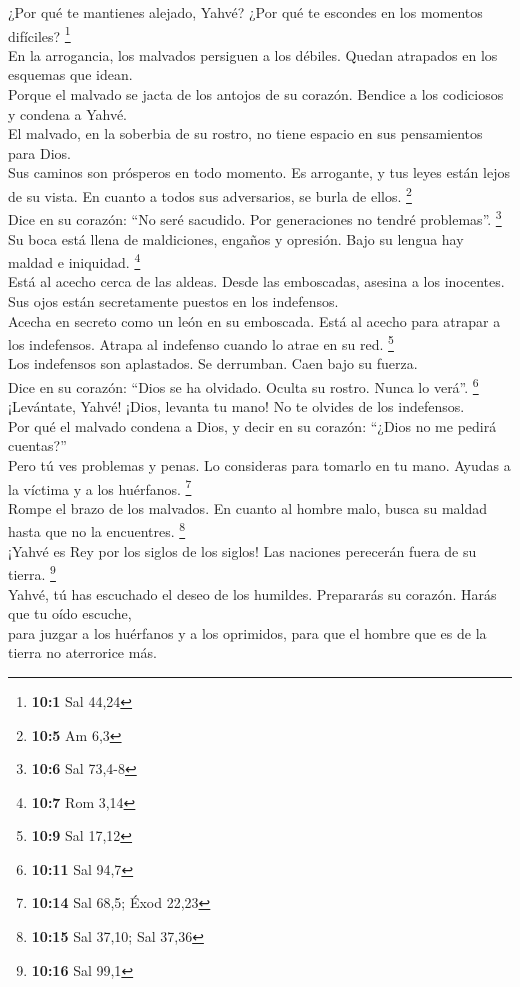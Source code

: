  ¿Por qué te mantienes alejado, Yahvé? ¿Por qué te
escondes en los momentos difíciles? \footnote{\textbf{10:1} Sal 44,24}\\
 En la arrogancia, los malvados persiguen a los débiles.
Quedan atrapados en los esquemas que idean.\\
 Porque el malvado se jacta de los antojos de su corazón.
Bendice a los codiciosos y condena a Yahvé.\\
 El malvado, en la soberbia de su rostro, no tiene espacio
en sus pensamientos para Dios.\\
 Sus caminos son prósperos en todo momento. Es arrogante,
y tus leyes están lejos de su vista. En cuanto a todos sus adversarios,
se burla de ellos. \footnote{\textbf{10:5} Am 6,3}\\
 Dice en su corazón: ``No seré sacudido. Por generaciones
no tendré problemas''. \footnote{\textbf{10:6} Sal 73,4-8}\\
 Su boca está llena de maldiciones, engaños y opresión.
Bajo su lengua hay maldad e iniquidad. \footnote{\textbf{10:7} Rom 3,14}\\
 Está al acecho cerca de las aldeas. Desde las emboscadas,
asesina a los inocentes. Sus ojos están secretamente puestos en los
indefensos.\\
 Acecha en secreto como un león en su emboscada. Está al
acecho para atrapar a los indefensos. Atrapa al indefenso cuando lo
atrae en su red. \footnote{\textbf{10:9} Sal 17,12}\\
 Los indefensos son aplastados. Se derrumban. Caen bajo
su fuerza.\\
 Dice en su corazón: ``Dios se ha olvidado. Oculta su
rostro. Nunca lo verá''. \footnote{\textbf{10:11} Sal 94,7}\\
 ¡Levántate, Yahvé! ¡Dios, levanta tu mano! No te olvides
de los indefensos.\\
 Por qué el malvado condena a Dios, y decir en su
corazón: ``¿Dios no me pedirá cuentas?''\\
 Pero tú ves problemas y penas. Lo consideras para
tomarlo en tu mano. Ayudas a la víctima y a los huérfanos. \footnote{\textbf{10:14}
  Sal 68,5; Éxod 22,23}\\
 Rompe el brazo de los malvados. En cuanto al hombre
malo, busca su maldad hasta que no la encuentres. \footnote{\textbf{10:15}
  Sal 37,10; Sal 37,36}\\
 ¡Yahvé es Rey por los siglos de los siglos! Las naciones
perecerán fuera de su tierra. \footnote{\textbf{10:16} Sal 99,1}\\
 Yahvé, tú has escuchado el deseo de los humildes.
Prepararás su corazón. Harás que tu oído escuche,\\
 para juzgar a los huérfanos y a los oprimidos, para que
el hombre que es de la tierra no aterrorice más.

